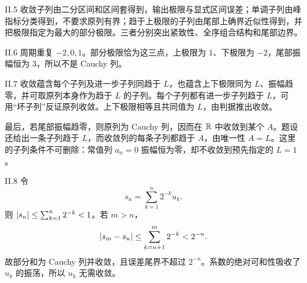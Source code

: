 \begin{solution}{II.5}
收敛子列由二分区间和区间套得到，输出极限与显式区间误差；单调子列由峰指标分类得到，不要求原列有界；趋于上极限的子列由尾部上确界近似性得到，并把极限指定为最大的部分极限。三者分别突出紧致性、全序组合结构和尾部边界。
\end{solution}

\begin{solution}{II.6}
周期重复 \(-2,0,1\)。部分极限恰为这三点，上极限为 \(1\)、下极限为 \(-2\)，尾部振幅恒为 \(3\)，所以不是 Cauchy 列。
\end{solution}

\begin{solution}{II.7}
收敛蕴含每个子列及进一步子列同趋于 \(L\)，也蕴含上下极限同为
\(L\)、振幅趋零，并可取原列本身作为趋于 \(L\) 的子列。每个子列都有进一步子列趋于 \(L\)，可用“坏子列”反证原列收敛。上下极限相等且共同值为 \(L\)，由判据推出收敛。

最后，若尾部振幅趋零，则原列为 Cauchy 列，因而在 \(\mathbb{R}\) 中收敛到某个
\(A\)。题设还给出一条子列趋于 \(L\)，而收敛列的每条子列都趋于
\(A\)，由唯一性 \(A=L\)。这里的子列条件不可删除：常值列 \(a_n=0\)
振幅恒为零，却不收敛到预先指定的 \(L=1\)。
\end{solution}

\begin{solution}{II.8}
令
\[
 s_n=\sum_{k=1}^n2^{-k}u_k.
\]
则 \(\left|s_n\right|\le\sum_{k=1}^n2^{-k}<1\)。若 \(m>n\)，
\[
 \left|s_m-s_n\right|\le\sum_{k=n+1}^m2^{-k}<2^{-n}.
\]
故部分和为 Cauchy 列并收敛，且误差尾界不超过 \(2^{-n}\)。系数的绝对可和性吸收了 \(u_k\) 的振荡，所以 \(u_k\) 无需收敛。
\end{solution}

